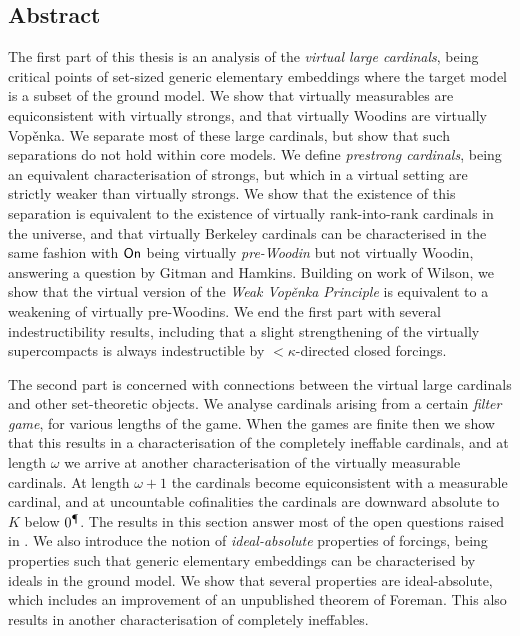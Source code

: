 \documentclass[../main]{subfiles}
\begin{document}
\thispagestyle{fancy}
\setlength{\parindent}{18pt}

\begin{onehalfspacing}

    \vspace*{75pt}

    \section*{\huge Abstract}

    The first part of this thesis is an analysis of the \textit{virtual large cardinals}, being critical points of set-sized generic elementary embeddings where the target model is a subset of the ground model. We show that virtually measurables are equiconsistent with virtually strongs, and that virtually Woodins are virtually Vop\v enka. We separate most of these large cardinals, but show that such separations do not hold within core models. We define \textit{prestrong cardinals}, being an equivalent characterisation of strongs, but which in a virtual setting are strictly weaker than virtually strongs. We show that the existence of this separation is equivalent to the existence of virtually rank-into-rank cardinals in the universe, and that virtually Berkeley cardinals can be characterised in the same fashion with $\textsf{On}$ being virtually \textit{pre-Woodin} but not virtually Woodin, answering a question by Gitman and Hamkins. Building on work of Wilson, we show that the virtual version of the \textit{Weak Vop\v enka Principle} is equivalent to a weakening of virtually pre-Woodins. We end the first part with several indestructibility results, including that a slight strengthening of the virtually supercompacts is always indestructible by ${<}\kappa$-directed closed forcings.

    The second part is concerned with connections between the virtual large cardinals and other set-theoretic objects. We analyse cardinals arising from a certain \textit{filter game}, for various lengths of the game. When the games are finite then we show that this results in a characterisation of the completely ineffable cardinals, and at length $\omega$ we arrive at another characterisation of the virtually measurable cardinals. At length $\omega+1$ the cardinals become equiconsistent with a measurable cardinal, and at uncountable cofinalities the cardinals are downward absolute to $K$ below $0^\mathparagraph$. The results in this section answer most of the open questions raised in \cite{HolySchlicht}. We also introduce the notion of \textit{ideal-absolute} properties of forcings, being properties such that generic elementary embeddings can be characterised by ideals in the ground model. We show that several properties are ideal-absolute, which includes an improvement of an unpublished theorem of Foreman. This also results in another characterisation of completely ineffables.

\end{onehalfspacing}
\end{document}
